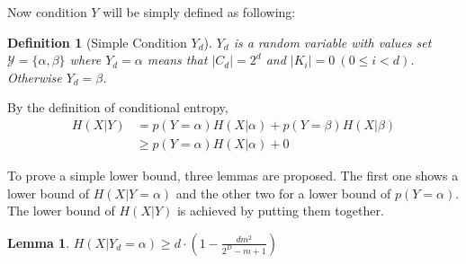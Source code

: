 \documentclass[10pt, conference, compsocconf]{IEEEtran}
\newtheorem{mydef}{Definition}
\newtheorem{mylemma}{Lemma}
\begin{document}
		Now condition $Y$ will be simply defined as following:
		\begin{mydef}[Simple Condition $Y_d$]
			$Y_d$ is a random variable with values set
			$\mathcal Y = \{ \alpha, \beta \}$ where
			$Y_d = \alpha$ means that $|C_d| = 2^d$
			and $|K_i| = 0~(0 \leq i < d)$.
			Otherwise $Y_d = \beta$.
		\end{mydef}
		
		By the definition of conditional entropy,
		\begin{align*}
			H(X|Y) &= p(Y = \alpha) H(X | \alpha) + p(Y = \beta) H(X | \beta)\\
				&\geq p(Y = \alpha) H(X | \alpha) + 0
		\end{align*}
		
		To prove a simple lower bound, three lemmas are proposed.
		The first one shows a lower bound of $H(X | Y = \alpha)$
		and the other two for a lower bound of $p(Y = \alpha)$.
		The lower bound of $H(X | Y)$ is achieved by putting
		them together.
		
		\begin{mylemma}\label{lem1}
			$H(X|Y_d = \alpha) \geq d \cdot (1-\frac{dm^2}{2^D-m+1})$
		\end{mylemma}
		
\end{document}
